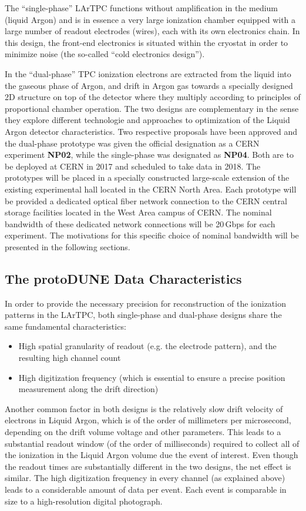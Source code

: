 \documentclass[pdftex,12pt,letter]{article}
\begin{document}
The ``single-phase''  LArTPC functions without amplification in the medium (liquid Argon) and is in essence a very large ionization chamber
equipped with a large number of readout electrodes (wires), each with its own electronics chain. In this design, the front-end electronics is
situated within the cryostat in order to minimize noise (the so-called ``cold electronics design'').

In the ``dual-phase''  TPC ionization
electrons are extracted from the liquid into the gaseous phase of Argon, and drift in Argon gas towards a specially designed 2D structure
on top of the detector where they multiply according to principles of proportional chamber operation. The two designs are complementary
in the sense they explore different technologie and approaches to optimization of the Liquid Argon detector characteristics.
Two respective  proposals have been approved and the dual-phase prototype was given the official designation as a CERN experiment \textbf{NP02},
while the single-phase was
designated as \textbf{NP04}. Both are to be deployed at CERN in 2017 and scheduled to take data in 2018. The prototypes will be placed in a specially
constructed large-scale extension of the existing experimental hall located in the CERN North Area. Each prototype will be provided a dedicated
optical fiber network connection to the CERN central storage facilities located in the West Area campus of CERN. The nominal bandwidth of these
dedicated network connections will be 20\,Gbps for each experiment. The motivations for this specific choice of nominal bandwidth will be
presented in the following sections.

\subsection{The protoDUNE Data Characteristics}

In order to provide the necessary precision for reconstruction of the ionization patterns in the LArTPC, both single-phase and dual-phase designs share the same fundamental characteristics:
\begin{itemize}
\item High spatial granularity of readout (e.g. the electrode pattern), and the resulting high channel count
\item High digitization frequency (which is essential to ensure a precise position measurement along the drift direction)
\end{itemize}

\noindent
Another common factor in both designs is the relatively slow drift velocity of electrons in Liquid Argon, which is of the order of millimeters per microsecond,
depending on the drift volume voltage and other parameters. This leads to a substantial readout window (of the order of milliseconds) required to collect
all of the ionization in the Liquid Argon volume due the event of interest. Even though the readout times are substantially different in the two designs,
the net effect is similar. The high digitization frequency in every channel (as explained above) leads to a considerable amount of data per event.
 Each event is comparable in size to a high-resolution digital photograph.
\end{document}
